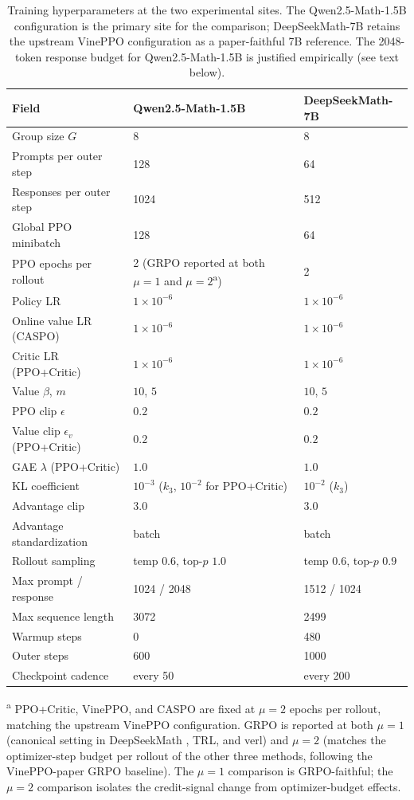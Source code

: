 \documentclass[11pt]{article}
\newcommand{\caspo}{\textsc{CASPO}}
\newcommand{\ppocritic}{PPO+Critic}
\newcommand{\grpo}{GRPO}
\newcommand{\vineppo}{VinePPO}
\begin{document}
\begin{table}[t]
\centering
\caption{Training hyperparameters at the two experimental sites. The
Qwen2.5-Math-1.5B configuration is the primary site for the comparison;
DeepSeekMath-7B retains the upstream \vineppo{} configuration as a
paper-faithful 7B reference. The 2048-token response budget for
Qwen2.5-Math-1.5B is justified empirically (see text below).}
\label{tab:hp}
\begin{tabular}{lll}
\toprule
Field & Qwen2.5-Math-1.5B & DeepSeekMath-7B \\
\midrule
Group size $G$ & 8 & 8 \\
Prompts per outer step & 128 & 64 \\
Responses per outer step & 1024 & 512 \\
Global PPO minibatch & 128 & 64 \\
PPO epochs per rollout & 2 (\grpo{} reported at both $\mu{=}1$ and $\mu{=}2$\textsuperscript{a}) & 2 \\
Policy LR & $1\times 10^{-6}$ & $1\times 10^{-6}$ \\
Online value LR (\caspo{}) & $1\times 10^{-6}$ & $1\times 10^{-6}$ \\
Critic LR (\ppocritic{}) & $1\times 10^{-6}$ & $1\times 10^{-6}$ \\
Value $\beta$, $m$ & $10$, $5$ & $10$, $5$ \\
PPO clip $\epsilon$ & $0.2$ & $0.2$ \\
Value clip $\epsilon_v$ (\ppocritic{}) & $0.2$ & $0.2$ \\
GAE $\lambda$ (\ppocritic{}) & $1.0$ & $1.0$ \\
KL coefficient & $10^{-3}$ ($k_3$, $10^{-2}$ for \ppocritic{}) & $10^{-2}$ ($k_3$) \\
Advantage clip & $3.0$ & $3.0$ \\
Advantage standardization & batch & batch \\
Rollout sampling & temp $0.6$, top-$p$ $1.0$ & temp $0.6$, top-$p$ $0.9$ \\
Max prompt / response & 1024 / 2048 & 1512 / 1024 \\
Max sequence length & 3072 & 2499 \\
Warmup steps & 0 & 480 \\
Outer steps & 600 & 1000 \\
Checkpoint cadence & every 50 & every 200 \\
\bottomrule
\end{tabular}

\smallskip
\footnotesize
\textsuperscript{a} \ppocritic{}, \vineppo{}, and \caspo{} are fixed at
$\mu{=}2$ epochs per rollout, matching the upstream \vineppo{}
configuration. \grpo{} is reported at both $\mu{=}1$ (canonical setting
in DeepSeekMath \citep{deepseekmath2024}, TRL, and verl) and $\mu{=}2$
(matches the optimizer-step budget per rollout of the other three
methods, following the \vineppo{}-paper \grpo{} baseline). The $\mu{=}1$
comparison is \grpo{}-faithful; the $\mu{=}2$ comparison isolates the
credit-signal change from optimizer-budget effects.
\end{table}
\end{document}
